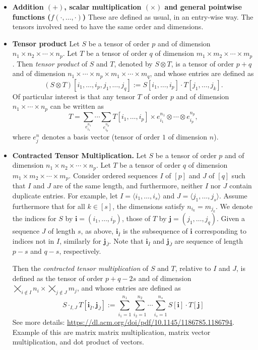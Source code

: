 \begin{itemize}
\item \textbf{Addition $(+)$, scalar multiplication $(\times)$ and general pointwise functions ($f(\cdot,\ldots,\cdot)$)} These are defined as usual, in an entry-wise way. The tensors involved need to have the same order and dimensions.

\item \textbf{Tensor product} Let $S$ be a tensor of order $p$ and of dimension $n_1\times n_2\times\cdots\times n_p$. Let 
$T$ be a tensor of order $q$ of dimension $m_1\times m_2\times\cdots\times m_p$. Then \textit{tensor product} of $S$ and $T$, denoted by $S\otimes T$, is a tensor of order $p+q$ and of dimension 
$n_1\times\cdots\times n_p\times m_1\times\cdots\times m_q$, and whose entries are defined as
$$
(S\otimes T)[i_1,\ldots,i_p,j_1,\ldots,j_q]:=S[i_1,\ldots,i_p]\cdot T[j_1,\ldots,j_k].
$$
Of particular interest is that any tensor $T$ of order $p$ and of dimension $n_1\times\cdots\times n_p$ can be written as 
$$
T=\sum_{e_{i_1}^{n_1}}\cdots \sum_{e_{i_p}^{n_p}} T[i_1,\ldots,i_p]\times e_{i_1}^{n_1}\otimes \cdots \otimes e_{i_p}^{n_p},$$
where $e_j^n$ denotes a basis vector (tensor of order $1$ of dimension $n$).

\item \textbf{Contracted Tensor Multiplication.} Let $S$ be a tensor of order $p$ and of dimension $n_1\times n_2\times\cdots\times n_p$. Let 
$T$ be a tensor of order $q$ of dimension $m_1\times m_2\times\cdots\times m_p$. Consider ordered sequences $I$ of $[p]$ and $J$ of $[q]$ such that $I$ and $J$
are of the same length, and furthermore, neither $I$ nor $J$ contain duplicate entries.
For example, let $I=\langle i_1,\ldots,i_s\rangle$ and $J=\langle j_1,\ldots,j_s\rangle$. Assume furthermore that for all $k\in[s]$, the dimensions satisfy $n_{i_k}=m_{j_k}$. We denote the
indices for $S$ by $\mathbf{i}=(i_1,\ldots,i_p)$, those of $T$ by $\mathbf{j}=(j_1,\ldots,j_q)$. Given a sequence
$J$ of length $s$, as above, $\mathbf{i}_{\bar I}$ is the subsequence of $\mathbf{i}$ corresponding to indices not in $I$, similarly for $\mathbf{j}_{\bar J}$. Note that $\mathbf{i}_{\bar I}$ and $\mathbf{j}_{\bar J}$ are sequence of length $p-s$ and $q-s$, respectively.

Then the \textit{contracted tensor multiplication} of $S$ and $T$, relative to $I$ and $J$, is defined as the tensor
of order $p+q-2s$ and of dimension $\bigtimes_{ i\not\in I} n_i\times \bigtimes_{j\not \in J} m_j$, and whose entries are defined as
$$
S\cdot_{I,J} T[\mathbf{i}_{\bar I},\mathbf{j}_{\bar J}]:=\sum_{i_1=1}^{n_1}\sum_{i_2=1}^{n_2}\cdots\sum_{i_s=1}^{n_s} S[\mathbf{i}]\cdot T[\mathbf{j}]
$$
See more details: \url{https://dl.acm.org/doi/pdf/10.1145/1186785.1186794}. Example of this are matrix matrix multiplication, matrix vector multiplication, and dot product of vectors.


\end{itemize}
